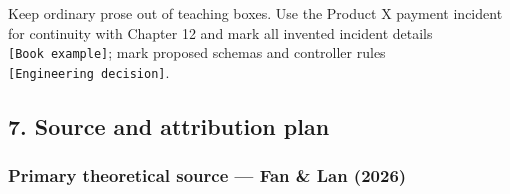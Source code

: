 Keep ordinary prose out of teaching boxes. Use the Product X payment incident for continuity with Chapter 12 and mark all invented incident details \texttt{{[}Book\ example{]}}; mark proposed schemas and controller rules \texttt{{[}Engineering\ decision{]}}.

\subsection{7. Source and attribution plan}\label{source-and-attribution-plan}

\subsubsection{Primary theoretical source --- Fan \& Lan (2026)}\label{primary-theoretical-source-fan-lan-2026}

